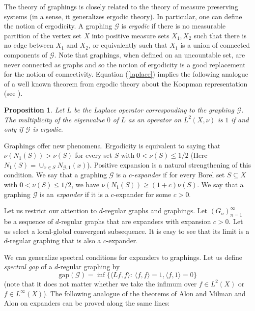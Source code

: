 \documentclass{article}
\newtheorem{proposition}[theorem]{Proposition}
\def\GG{\mathcal{G}}\def\HH{\mathcal{H}}\def\II{\mathcal{I}}
\begin{document}
\medskip

The theory of graphings is closely related to the theory of measure
preserving systems (in a sense, it generalizes ergodic theory). In
particular, one can define the notion of ergodicity. A graphing $\GG$
is \emph{ergodic} if there is no measurable partition of the vertex
set $X$ into positive measure sets $X_1,X_2$ such that there is no
edge between $X_1$ and $X_2$, or equivalently such that $X_1$ is a
union of connected components of $\GG$. Note that graphings, when
defined on an uncountable set, are never connected as graphs and so
the notion of ergodicity is a good replacement for the notion of
connectivity. Equation (\ref{laplace}) implies the following analogue
of a well known theorem from ergodic theory about the Koopman
representation (see \cite{Glas}).

\begin{proposition}\label{PROP:ERGODIC}
Let $L$ be the Laplace operator corresponding to the graphing $\GG$. The
multiplicity of the eigenvalue $0$ of $L$ as an operator on
$L^2(X,\nu)$ is $1$ if and only if $\GG$ is ergodic.
\end{proposition}

Graphings offer new phenomena. Ergodicity is equivalent to saying
that $\nu(N_1(S))>\nu(S)$ for every set $S$ with $0<\nu(S)\le 1/2$
(Here $N_1(S)=\cup_{x\in S} N_{\GG,1}(x)$). Positive expansion is a
natural strengthening of this condition. We say that a graphing $\GG$
is a \emph{$c$-expander} if for every Borel set $S\subseteq X$ with
$0<\nu(S)\le 1/2$, we have $\nu(N_1(S))\ge (1+c)\nu(S)$.  We say that
a graphing $\GG$ is an \emph{expander} if it is a $c$-expander for
some $c>0$.

{Let us restrict our attention to $d$-regular graphs and graphings.}
Let $(G_n)_{n=1}^\infty$ be a sequence of $d$-regular graphs that are
expanders with expansion $c>0$. Let us select a local-global
convergent subsequence. {It is easy to see that} its limit is a
$d$-regular graphing that is also a $c$-expander.

We can generalize spectral conditions for expanders to graphings. Let
us define \emph{spectral gap} of a $d$-regular graphing by
\[
\text{gap}(\GG)=\inf\{\langle Lf,f\rangle:~\langle f,f\rangle=1,
\langle f,1\rangle=0\}
\]
{(note that it does not matter whether we take the infimum over $f\in
L^2(X)$ or $f\in L^\infty(X)$)}. The following analogue of the
theorems of Alon and Milman \cite{AlMi} and Alon \cite{Alon} on
expanders can be proved along the same lines:
\end{document}
